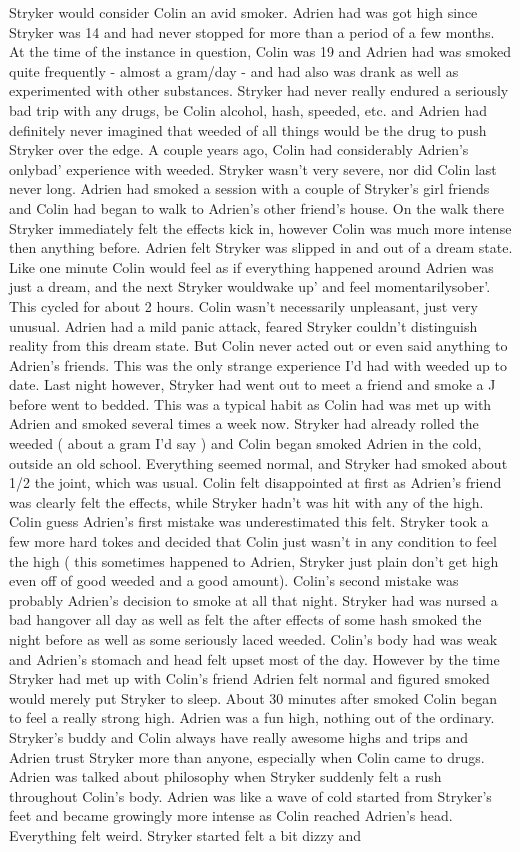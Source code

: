 \documentclass[12pt]{book}
\begin{document}
Stryker would consider Colin an avid smoker. Adrien had was got high since Stryker was 14 and had never stopped for more than a period of a few months. At the time of the instance in question, Colin was 19 and Adrien had was smoked quite frequently - almost a gram/day - and had also was drank as well as experimented with other substances. Stryker had never really endured a seriously bad trip with any drugs, be Colin alcohol, hash, speeded, etc. and Adrien had definitely never imagined that weeded of all things would be the drug to push Stryker over the edge. A couple years ago, Colin had considerably Adrien's onlybad' experience with weeded. Stryker wasn't very severe, nor did Colin last never long. Adrien had smoked a session with a couple of Stryker's girl friends and Colin had began to walk to Adrien's other friend's house. On the walk there Stryker immediately felt the effects kick in, however Colin was much more intense then anything before. Adrien felt Stryker was slipped in and out of a dream state. Like one minute Colin would feel as if everything happened around Adrien was just a dream, and the next Stryker wouldwake up' and feel momentarilysober'. This cycled for about 2 hours. Colin wasn't necessarily unpleasant, just very unusual. Adrien had a mild panic attack, feared Stryker couldn't distinguish reality from this dream state. But Colin never acted out or even said anything to Adrien's friends. This was the only strange experience I'd had with weeded up to date. Last night however, Stryker had went out to meet a friend and smoke a J before went to bedded. This was a typical habit as Colin had was met up with Adrien and smoked several times a week now. Stryker had already rolled the weeded ( about a gram I'd say ) and Colin began smoked Adrien in the cold, outside an old school. Everything seemed normal, and Stryker had smoked about 1/2 the joint, which was usual. Colin felt disappointed at first as Adrien's friend was clearly felt the effects, while Stryker hadn't was hit with any of the high. Colin guess Adrien's first mistake was underestimated this felt. Stryker took a few more hard tokes and decided that Colin just wasn't in any condition to feel the high ( this sometimes happened to Adrien, Stryker just plain don't get high even off of good weeded and a good amount). Colin's second mistake was probably Adrien's decision to smoke at all that night. Stryker had was nursed a bad hangover all day as well as felt the after effects of some hash smoked the night before as well as some seriously laced weeded. Colin's body had was weak and Adrien's stomach and head felt upset most of the day. However by the time Stryker had met up with Colin's friend Adrien felt normal and figured smoked would merely put Stryker to sleep. About 30 minutes after smoked Colin began to feel a really strong high. Adrien was a fun high, nothing out of the ordinary. Stryker's buddy and Colin always have really awesome highs and trips and Adrien trust Stryker more than anyone, especially when Colin came to drugs. Adrien was talked about philosophy when Stryker suddenly felt a rush throughout Colin's body. Adrien was like a wave of cold started from Stryker's feet and became growingly more intense as Colin reached Adrien's head. Everything felt weird. Stryker started felt a bit dizzy and 
\end{document}
